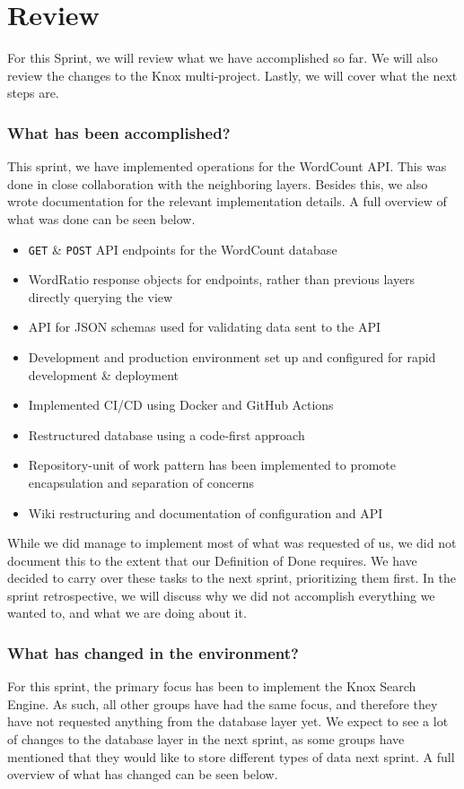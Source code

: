 \section{Review}
For this Sprint, we will review what we have accomplished so far. We will also review the changes to the Knox multi-project. Lastly, we will
cover what the next steps are.

\subsubsection{What has been accomplished?}
This sprint, we have implemented operations for the WordCount API. This was done in close collaboration with the neighboring layers. Besides this, we also wrote documentation for the relevant implementation details. A full overview of what was done can be seen below.

\begin{itemize}
    \item \texttt{GET} \& \texttt{POST} API endpoints for the WordCount database
    \item WordRatio response objects for endpoints, rather than previous layers directly querying the view
    \item API for JSON schemas used for validating data sent to the API
    \item Development and production environment set up and configured for rapid development \& deployment
    \item Implemented CI/CD using Docker and GitHub Actions
    \item Restructured database using a code-first approach
    \item Repository-unit of work pattern has been implemented to promote encapsulation and separation of concerns
    \item Wiki restructuring and documentation of configuration and API
\end{itemize}

While we did manage to implement most of what was requested of us, we did not document this to the extent that our Definition of Done requires. We have decided to carry over these tasks to the next sprint, prioritizing them first. In the sprint retrospective, we will discuss why we did not accomplish everything we wanted to, and what we are doing about it.

\subsubsection{What has changed in the environment?}
For this sprint, the primary focus has been to implement the Knox Search Engine. As such, all other groups have had the same focus, and therefore they have not requested anything from the database layer yet. We expect to see a lot of changes to the database layer in the next sprint, as some groups have mentioned that they would like to store different types of data next sprint.
A full overview of what has changed can be seen below.

